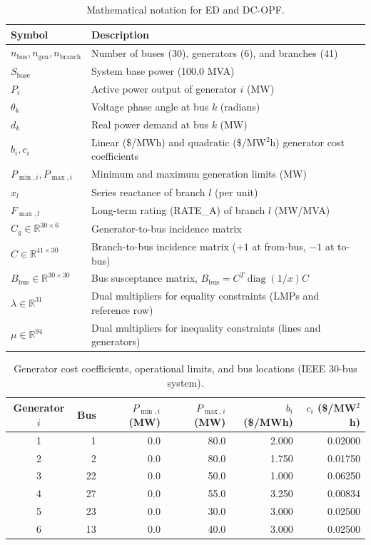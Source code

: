 \begin{table}[htbp]
\centering
\caption{Mathematical notation for ED and DC-OPF.}
\label{tab:notation}
\begin{tabular}{ll}
\toprule
Symbol & Description \\
\midrule
$n_{\text{bus}}, n_{\text{gen}}, n_{\text{branch}}$ & Number of buses (30), generators (6), and branches (41) \\
$S_{\text{base}}$ & System base power (100.0 MVA) \\
$P_i$ & Active power output of generator $i$ (MW) \\
$\theta_k$ & Voltage phase angle at bus $k$ (radians) \\
$d_k$ & Real power demand at bus $k$ (MW) \\
$b_i, c_i$ & Linear (\$/MWh) and quadratic (\$/MW$^2$h) generator cost coefficients \\
$P_{\min, i}, P_{\max, i}$ & Minimum and maximum generation limits (MW) \\
$x_l$ & Series reactance of branch $l$ (per unit) \\
$F_{\max, l}$ & Long-term rating (RATE\_A) of branch $l$ (MW/MVA) \\
$C_g \in \mathbb{R}^{30 \times 6}$ & Generator-to-bus incidence matrix \\
$C \in \mathbb{R}^{41 \times 30}$ & Branch-to-bus incidence matrix ($+1$ at from-bus, $-1$ at to-bus) \\
$B_{\text{bus}} \in \mathbb{R}^{30 \times 30}$ & Bus susceptance matrix, $B_{\text{bus}} = C^T \operatorname{diag}(1/x) C$ \\
$\lambda \in \mathbb{R}^{31}$ & Dual multipliers for equality constraints (LMPs and reference row) \\
$\mu \in \mathbb{R}^{94}$ & Dual multipliers for inequality constraints (lines and generators) \\
\bottomrule
\end{tabular}
\end{table}

\begin{table}[htbp]
\centering
\caption{Generator cost coefficients, operational limits, and bus locations (IEEE 30-bus system).}
\label{tab:generator_data}
\begin{tabular}{crrrrr}
\toprule
Generator $i$ & Bus & $P_{\min, i}$ (MW) & $P_{\max, i}$ (MW) & $b_i$ (\$/MWh) & $c_i$ (\$/MW$^2$h) \\
\midrule
1 & 1  & 0.0 & 80.0 & 2.000 & 0.02000 \\
2 & 2  & 0.0 & 80.0 & 1.750 & 0.01750 \\
3 & 22 & 0.0 & 50.0 & 1.000 & 0.06250 \\
4 & 27 & 0.0 & 55.0 & 3.250 & 0.00834 \\
5 & 23 & 0.0 & 30.0 & 3.000 & 0.02500 \\
6 & 13 & 0.0 & 40.0 & 3.000 & 0.02500 \\
\bottomrule
\end{tabular}
\end{table}

